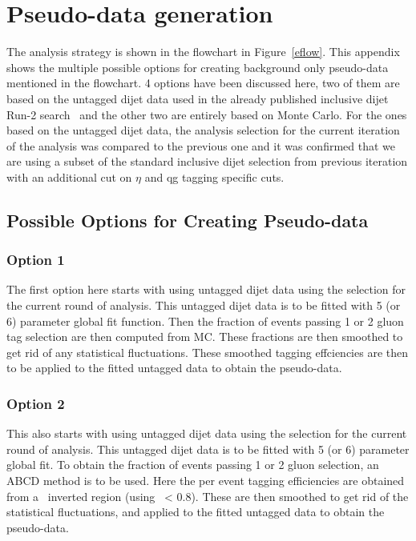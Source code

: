 \section{Pseudo-data generation}

The analysis strategy is shown in the flowchart in Figure~\ref{eflow}. This appendix shows the multiple possible options for 
creating background only pseudo-data mentioned in the flowchart. 4 options have been discussed here, two of them are
based on the untagged dijet data used in the already published inclusive dijet Run-2 search~\cite{Nishu:2646455} and the other two are entirely based on Monte Carlo.
For the ones based on the untagged dijet data, the analysis selection for the current iteration of the analysis 
was compared to the previous one and it was confirmed that we are using a subset of the standard inclusive dijet selection from 
previous iteration with an additional cut on $\eta$ and qg tagging specific cuts.

\subsection{Possible Options for Creating Pseudo-data}
\subsubsection{Option 1}
The first option here starts with using untagged dijet data using the selection for the current round of analysis. 
This untagged dijet data is to be fitted with 5 (or 6) parameter global fit
function. Then the fraction of events passing 1 or 2 gluon tag selection are then computed from MC. These fractions are then smoothed to 
get rid of any statistical fluctuations. These smoothed tagging effciencies are then to be applied to the fitted untagged data to obtain the pseudo-data. 

\subsubsection{Option 2}
This also starts with using untagged dijet data using the selection for the current round of analysis. 
This untagged dijet data is to be fitted with 5 (or 6) parameter global fit. To obtain the fraction of events
passing 1 or 2 gluon selection, an ABCD method is to be used. Here the per event tagging efficiencies
are obtained from a \ystar\ inverted region (using \ystar\ < 0.8). These are then smoothed to get rid of the 
statistical fluctuations, and applied to the fitted untagged data to obtain the pseudo-data.  

